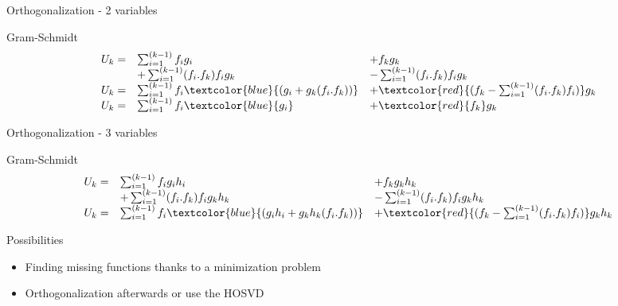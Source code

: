 \documentclass[12pt]{beamer}
\newcommand\FontPOD{\fontsize{10}{12}\selectfont}
\begin{document}
\begin{frame}{Orthogonalization - 2 variables}
\begin{figure}[t]
	\vspace{-0.6cm}
	\end{figure}
	\centering
	   \begin{minipage}{1\linewidth}
			\begin{exampleblock}{Gram-Schmidt}
				\vspace{-0.4cm}
				\[
				\begin{array}{l l l}
				U_k =	& \sum_{i=1}^{(k-1)}  f_i g_i &+ f_k g_k\\
							& + \sum_{i=1}^{(k-1)}  (f_i.f_k) f_i g_k &- \sum_{i=1}^{(k-1)}  (f_i.f_k) f_i g_k\\
				U_k = & \sum_{i=1}^{(k-1)} f_i \textcolor{blue}{(g_i+g_k(f_i.f_k))} &+ \textcolor{red}{(f_k-\sum_{i=1}^{(k-1)}(f_i.f_k)f_i )}g_k\\
				U_k =	& \sum_{i=1}^{(k-1)}  f_i \textcolor{blue}{g_i} &+ \textcolor{red}{f_k} g_k\\
				\end{array}
				\]
				\vspace{-0.3cm}
			\end{exampleblock}
	   \end{minipage}
\end{frame}


\begin{frame}{Orthogonalization - 3 variables}
\FontPOD

	\centering
	   \begin{minipage}{1\linewidth}
			\begin{exampleblock}{Gram-Schmidt}
				\vspace{-0.6cm}
				\[
				\begin{array}{l l l}
				U_k =	& \sum_{i=1}^{(k-1)}  f_i g_i h_i &+ f_k g_k h_k\\
							& + \sum_{i=1}^{(k-1)}  (f_i.f_k) f_i g_k h_k &- \sum_{i=1}^{(k-1)}  (f_i.f_k) f_i g_k h_k\\
				U_k = & \sum_{i=1}^{(k-1)} f_i \textcolor{blue}{(g_i h_i+g_k h_k(f_i.f_k))} 
								&+ \textcolor{red}{(f_k-\sum_{i=1}^{(k-1)}(f_i.f_k)f_i )}g_k h_k\\
				\end{array}
				\]
				\vspace{-0.3cm}
			\end{exampleblock}
	   \end{minipage}
	   
	\centering
	   \begin{minipage}{0.9\linewidth}
			\begin{exampleblock}{Possibilities}
				\begin{itemize}
				 	\item Finding missing functions thanks to a minimization problem
				 	\item Orthogonalization afterwards or use the HOSVD
				\end{itemize}
			\end{exampleblock}
	   \end{minipage}
\end{frame}
\end{document}
